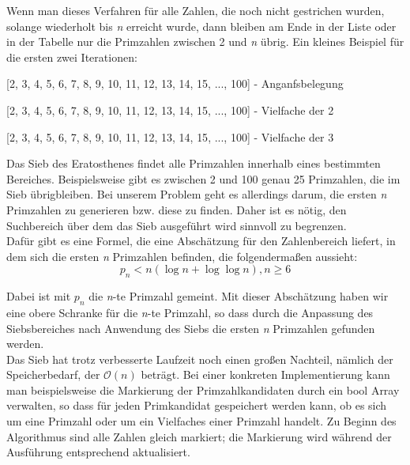 \documentclass[course=erap]{aspdoc}
\begin{document}
Wenn man dieses Verfahren für alle Zahlen, die noch nicht gestrichen wurden, solange wiederholt bis \textit{n} erreicht wurde,
dann bleiben am Ende in der Liste oder in der Tabelle nur die Primzahlen zwischen 2 und \textit{n} übrig. Ein kleines Beispiel für die ersten zwei Iterationen: 
\begin{center} [2, 3, 4, 5, 6, 7, 8, 9, 10, 11, 12, 13, 14, 15, ..., 100] -  Anganfsbelegung \end{center}
\begin{center} [2, 3, {\color{red}4}, 5,  {\color{red}6}, 7, {\color{red}8}, 9,  {\color{red}10}, 11, {\color{red}12}, 13, {\color{red}14}, 15, ..., {\color{red}100}] - Vielfache der 2 \end{center}
\begin{center} [2, 3, {\color{red}4}, 5,  {\color{red}6}, 7, {\color{red}8}, {\color{red}9},  {\color{red}10}, 11, {\color{red}12}, 13, {\color{red}14}, {\color{red}15}, ..., {\color{red}100}] -  Vielfache der 3\end{center}
Das Sieb des Eratosthenes findet alle Primzahlen innerhalb eines bestimmten Bereiches. 
Beispielsweise gibt es zwischen 2 und 100 genau 25 Primzahlen, die im Sieb übrigbleiben. 
Bei unserem Problem geht es allerdings darum, die ersten \textit{n} Primzahlen zu generieren bzw. diese zu finden. 
Daher ist es nötig, den Suchbereich  über dem das Sieb ausgeführt wird sinnvoll zu begrenzen.\\
Dafür gibt es eine Formel, die eine Abschätzung für den Zahlenbereich liefert, in dem sich die ersten \textit{n} Primzahlen befinden, die folgendermaßen aussieht:$$p_n<n(\log n + \log\log n), n \geq 6$$ \begin{flushright} \cite{Axler} \end{flushright}
Dabei ist mit $p_n$ die \textit{n}-te Primzahl gemeint. Mit dieser Abschätzung haben wir eine obere Schranke für die \textit{n}-te Primzahl, 
so dass durch die Anpassung des Siebsbereiches nach Anwendung des Siebs die ersten \textit{n} Primzahlen gefunden werden.\\ Das Sieb hat trotz verbesserte Laufzeit noch einen großen Nachteil, 
nämlich der Speicherbedarf, der $\mathcal{O}(n)$ beträgt. 
Bei einer konkreten Implementierung kann man beispielsweise die Markierung der Primzahlkandidaten durch ein bool Array verwalten, 
so dass für jeden Primkandidat gespeichert werden kann, ob es sich um eine Primzahl oder um ein Vielfaches einer Primzahl handelt. 
Zu Beginn des Algorithmus sind alle Zahlen gleich markiert; die Markierung wird während der Ausführung entsprechend aktualisiert. 
\end{document}
